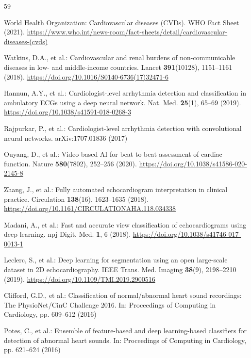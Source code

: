 \documentclass[AMA,STIX1COL,]{WileyNJD-v2}
\begin{document}
\begin{thebibliography}{59}

World Health Organization: Cardiovascular diseases (CVDs). WHO Fact Sheet (2021). \url{https://www.who.int/news-room/fact-sheets/detail/cardiovascular-diseases-(cvds)}

Watkins, D.A., et al.: Cardiovascular and renal burdens of non-communicable diseases in low- and middle-income countries. Lancet \textbf{391}(10128), 1151--1161 (2018). \url{https://doi.org/10.1016/S0140-6736(17)32471-6}

Hannun, A.Y., et al.: Cardiologist-level arrhythmia detection and classification in ambulatory ECGs using a deep neural network. Nat. Med. \textbf{25}(1), 65--69 (2019). \url{https://doi.org/10.1038/s41591-018-0268-3}

Rajpurkar, P., et al.: Cardiologist-level arrhythmia detection with convolutional neural networks. arXiv:1707.01836 (2017)

Ouyang, D., et al.: Video-based AI for beat-to-beat assessment of cardiac function. Nature \textbf{580}(7802), 252--256 (2020). \url{https://doi.org/10.1038/s41586-020-2145-8}

Zhang, J., et al.: Fully automated echocardiogram interpretation in clinical practice. Circulation \textbf{138}(16), 1623--1635 (2018). \url{https://doi.org/10.1161/CIRCULATIONAHA.118.034338}

Madani, A., et al.: Fast and accurate view classification of echocardiograms using deep learning. npj Digit. Med. \textbf{1}, 6 (2018). \url{https://doi.org/10.1038/s41746-017-0013-1}

Leclerc, S., et al.: Deep learning for segmentation using an open large-scale dataset in 2D echocardiography. IEEE Trans. Med. Imaging \textbf{38}(9), 2198--2210 (2019). \url{https://doi.org/10.1109/TMI.2019.2900516}

Clifford, G.D., et al.: Classification of normal/abnormal heart sound recordings: The PhysioNet/CinC Challenge 2016. In: Proceedings of Computing in Cardiology, pp. 609--612 (2016)

Potes, C., et al.: Ensemble of feature-based and deep learning-based classifiers for detection of abnormal heart sounds. In: Proceedings of Computing in Cardiology, pp. 621--624 (2016)


\end{thebibliography}
\end{document}
